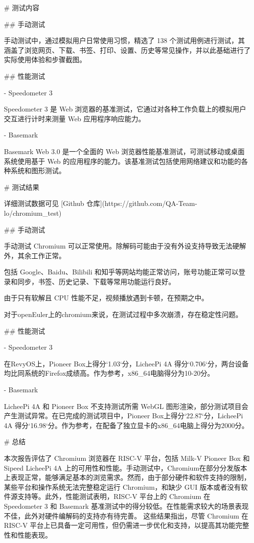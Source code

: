 \documentclass{article}
\begin{document}
\begin{markdown}
# 测试内容

## 手动测试

手动测试中，通过模拟用户日常使用习惯，精选了 138 个测试用例进行测试，其涵盖了浏览网页、下载、书签、打印、设置、历史等常见操作，并以此基础进行了实际使用体验和步骤截图。

## 性能测试

- Speedometer 3

Speedometer 3 是 Web 浏览器的基准测试，它通过对各种工作负载上的模拟用户交互进行计时来测量 Web 应用程序响应能力。

- Basemark

Basemark Web 3.0 是一个全面的 Web 浏览器性能基准测试，可测试移动或桌面系统使用基于 Web 的应用程序的能力。该基准测试包括使用网络建议和功能的各种系统和图形测试。

# 测试结果

详细测试数据可见 [Github 仓库](https://github.com/QA-Team-lo/chromium_test)

## 手动测试

手动测试 Chromium 可以正常使用。除解码可能由于没有外设支持导致无法硬解外，其余工作正常。

包括 Google、Baidu、Bilibili 和知乎等网站均能正常访问，账号功能正常可以登录和同步，书签、历史记录、下载等常用功能运行良好。

由于只有软解且 CPU 性能不足，视频播放遇到卡顿，在预期之中。

对于openEuler上的chromium来说，在测试过程中多次崩溃，存在稳定性问题。


## 性能测试

- Speedometer 3

在RevyOS上，Pioneer Box上得分`1.03`分，LicheePi 4A 得分`0.706`分，两台设备均比同系统的Firefox成绩高。作为参考，x86_64电脑得分为10-20分。

- Basemark

LicheePi 4A 和 Pioneer Box 不支持测试所需 WebGL 图形渲染，部分测试项目会产生测试异常。在已完成的测试项目中，Pioneer Box上得分`22.87`分，LicheePi 4A 得分`16.98`分。作为参考，在配备了独立显卡的x86_64电脑上得分为2000分。

# 总结

本次报告评估了 Chromium 浏览器在 RISC-V 平台，包括 Milk-V Pioneer Box 和 Sipeed LicheePi 4A 上的可用性和性能。手动测试中，Chromium在部分分发版本上表现正常，能够满足基本的浏览需求。然而，由于部分硬件和软件支持的限制，某些平台和操作系统无法完整稳定运行 Chromium，和缺少 GUI 版本或者没有软件源支持等。此外，性能测试表明，RISC-V 平台上的 Chromium 在 Speedometer 3 和 Basemark 基准测试中的得分较低。在性能需求较大的场景表现不佳，此外对硬件编解码的支持亦有待完善。
这些结果指出，尽管 Chromium 在 RISC-V 平台上已具备一定可用性，但仍需进一步优化和支持，以提高其功能完整性和性能表现。

\end{markdown}
\end{document}
